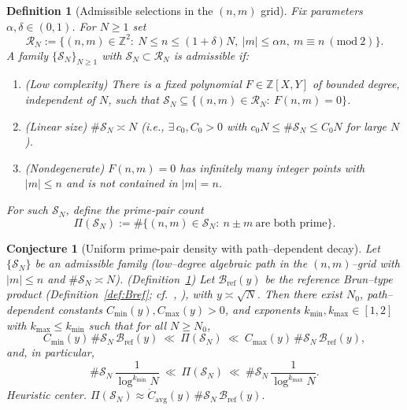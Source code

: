 \documentclass[11pt]{article}
\theoremstyle{inline}
\theoremstyle{break}
\theoremstyle{break}
\theoremstyle{break}
\newtheorem{conjecture}{Conjecture}
\theoremstyle{break}
\theoremstyle{break}
\newtheorem{definition}{Definition}
\theoremstyle{inline}
\newcommand{\tavg}{{\scriptscriptstyle\mathrm{avg}}}
\newcommand{\tref}{{\scriptscriptstyle\mathrm{ref}}}
\newcommand{\Cpred}{\mathring{C}}   %
\newcommand{\Bref}{\mathcal{B}_\tref}
\begin{document}
\begin{definition}[Admissible selections in the \( (n,m) \) grid]
\label{def:admissible}
Fix parameters \( \alpha,\delta\in(0,1) \). For \( N\ge 1 \) set
\begin{equation}
\mathcal{R}_N:=\{(n,m)\in\mathbb{Z}^2:\ N\le n\le (1+\delta)N,\ |m|\le \alpha n,\ m\equiv n \ (\mathrm{mod}\ 2)\}.
\end{equation}
A family \( \{\mathcal{S}_N\}_{N\ge 1} \) with \( \mathcal{S}_N\subset\mathcal{R}_N \) is \emph{admissible} if:
\begin{enumerate}
\item[(A1)] (\emph{Low complexity}) There is a fixed polynomial \( F\in\mathbb{Z}[X,Y] \) of bounded degree, independent of \( N \), such that
\( \mathcal{S}_N \subseteq \{(n,m)\in\mathcal{R}_N:\ F(n,m)=0\} \).
\item[(A2)] (\emph{Linear size}) \( \#\mathcal{S}_N \asymp N \) (i.e., \( \exists\,c_0,C_0>0 \) with \( c_0 N\le \#\mathcal{S}_N\le C_0 N \) for large \( N \)).
\item[(A3)] (\emph{Nondegenerate}) \( F(n,m)=0 \) has infinitely many integer points with \( |m|\le n \) and is not contained in \( |m|=n \).
\end{enumerate}
For such \( \mathcal{S}_N \), define the prime-pair count
\begin{equation}
\Pi(\mathcal{S}_N):=\#\{(n,m)\in\mathcal{S}_N:\ n\pm m\ \text{are both prime}\}.
\end{equation}
\end{definition}

\begin{conjecture}[Uniform prime-pair density with path–dependent decay]\label{conj:uniform-C}
Let \( \{\mathcal{S}_N\} \) be an admissible family (low–degree algebraic path in the \( (n,m) \)–grid with \( |m|\le n \) and \( \#\mathcal{S}_N\asymp N \)).  (Definition~\ref{def:admissible})
Let \( \Bref(y) \) be the reference Brun–type product
(Definition~\ref{def:Bref}; cf.~\cite[§1.6]{HalberstamRichert1974}, \cite[Ch.~4]{Riesel1994}),
with \( y\asymp\sqrt{N} \).
Then there exist \( N_0 \), path–dependent constants \( C_{\min}(y),C_{\max}(y)>0 \), and exponents
\( k_{\min},k_{\max}\in[1,2] \) with \( k_{\max} \le k_{\min} \) such that for all \( N\ge N_0 \),
\begin{equation}
C_{\min}(y)\,\#\mathcal{S}_N\,\Bref(y)
\ \ll\
\Pi(\mathcal{S}_N)
\ \ll\
C_{\max}(y)\,\#\mathcal{S}_N\,\Bref(y),
\end{equation}
and, in particular,
\begin{equation}
\#\mathcal{S}_N\,\frac{1}{\log^{k_{\min}} N}
\ \ll\
\Pi(\mathcal{S}_N)
\ \ll\
\#\mathcal{S}_N\,\frac{1}{\log^{k_{\max}} N}.
\end{equation}
\emph{Heuristic center.}\quad
\( \Pi(\mathcal{S}_N)\approx \Cpred_\tavg(y)\,\#\mathcal{S}_N\,\Bref(y) \).
\end{conjecture}
\end{document}
